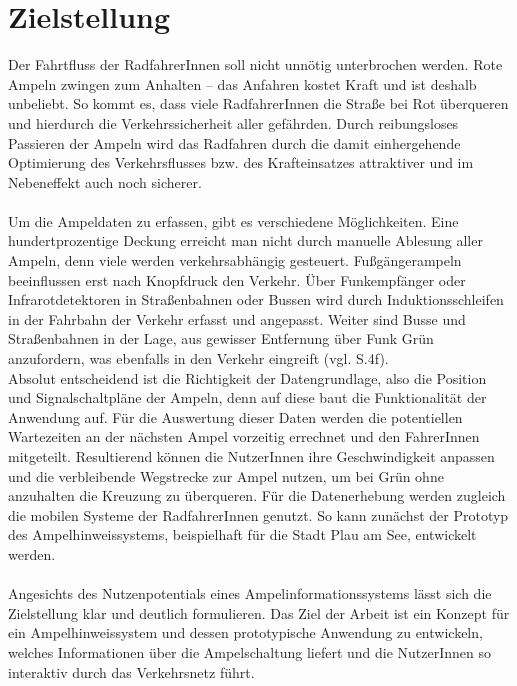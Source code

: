 \section{Zielstellung}
Der Fahrtfluss der RadfahrerInnen soll nicht unnötig unterbrochen werden. Rote Ampeln zwingen zum Anhalten -- das Anfahren kostet Kraft und ist deshalb unbeliebt. So kommt es, dass viele RadfahrerInnen die Straße bei Rot überqueren und hierdurch die Verkehrssicherheit aller gefährden. Durch reibungsloses Passieren der Ampeln wird das Radfahren durch die damit einhergehende Optimierung des Verkehrsflusses bzw. des Krafteinsatzes attraktiver und im Nebeneffekt auch noch sicherer.\\\\
Um die Ampeldaten zu erfassen, gibt es verschiedene Möglichkeiten. Eine hundertprozentige Deckung erreicht man nicht durch manuelle Ablesung aller Ampeln, denn viele  werden verkehrsabhängig gesteuert. Fußgängerampeln beeinflussen erst nach Knopfdruck den Verkehr. Über Funkempfänger oder Infrarotdetektoren in Straßenbahnen oder Bussen wird durch Induktionsschleifen in der Fahrbahn der Verkehr erfasst und angepasst. Weiter sind Busse und Straßenbahnen in der Lage, aus gewisser Entfernung über Funk Grün anzufordern, was ebenfalls in den Verkehr eingreift (vgl. \cite{lsa_bln} S.4f). \\
Absolut entscheidend ist die Richtigkeit der Datengrundlage, also die Position und Signalschaltpläne der Ampeln, denn auf diese baut die Funktionalität der Anwendung auf.
Für die Auswertung dieser Daten werden die potentiellen Wartezeiten an der nächsten Ampel vorzeitig errechnet und den FahrerInnen mitgeteilt. Resultierend können die NutzerInnen ihre Geschwindigkeit anpassen und die verbleibende Wegstrecke zur Ampel nutzen, um bei Grün ohne anzuhalten die Kreuzung zu überqueren. Für die Datenerhebung werden zugleich die mobilen Systeme der RadfahrerInnen genutzt. So kann zunächst der Prototyp des Ampelhinweissystems, beispielhaft für die Stadt Plau am See, entwickelt werden.\\\\
Angesichts des Nutzenpotentials eines Ampelinformationssystems lässt sich die Zielstellung klar und deutlich formulieren. Das Ziel der Arbeit ist ein Konzept für ein Ampelhinweissystem und dessen prototypische Anwendung zu entwickeln, welches Informationen über die Ampelschaltung liefert und die NutzerInnen so interaktiv durch das Verkehrsnetz führt.
